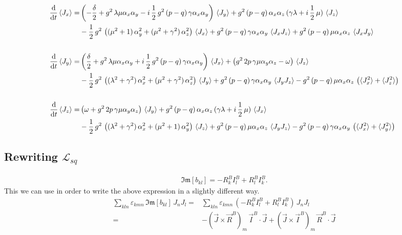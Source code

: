 \documentclass{article}
\begin{document}
\begin{align*}
    \frac{\text{d}}{\text{d}t} \braket{J_x}=&\left(  -\frac{\delta}{2}+  g^2\,\lambda\mu\alpha_x\alpha_y - i\,\frac{1}{2}\,g^2\,(p-q)\,\gamma\alpha_x\alpha_y \right)\,\braket{J_y}+g^2\,(p-q)\,\alpha_x\alpha_z\,(\gamma\lambda+ i\, \frac{1}{2}\,\mu)\,\braket{J_z}\\
    &-\frac{1}{2}\,g^2\,\left((\mu^2+1)\,\alpha_y^2+ (\mu^2+\gamma^2)\,\alpha_z^2\right)\,\braket{J_x}+g^2\,(p-q)\,\gamma\alpha_x\alpha_y \,\braket{J_xJ_z}+g^2\,(p-q)\,\mu\alpha_x\alpha_z\,\braket{J_xJ_y}\\\\
    \frac{\text{d}}{\text{d}t} \braket{J_y}=&\left( \frac{\delta}{2} + g^2\,\lambda\mu\alpha_x\alpha_y + i\,\frac{1}{2}\,g^2\,(p-q)\,\gamma\alpha_x\alpha_y \right)\,\braket{J_x}+\left(g^2\,2p\,\gamma\mu\alpha_y\alpha_z-\omega\right)\,\braket{J_z}\\
    &-\frac{1}{2}\,g^2\,\left((\lambda^2+\gamma^2)\,\alpha_x^2+(\mu^2+\gamma^2)\,\alpha_z^2\right)\,\braket{J_y}+g^2\,(p-q)\,\gamma\alpha_x\alpha_y \,\braket{J_y J_z}-g^2\,(p-q)\,\mu\alpha_x\alpha_z\,\left(\braket{J_x^2}+\braket{J_z^2}\right)\\\\
    \frac{\text{d}}{\text{d}t} \braket{J_z}=&\left( \omega + g^2\,2p\,\gamma\mu\alpha_y\alpha_z \right)\,\braket{J_y}+g^2\,(p-q)\,\alpha_x\alpha_z \,(\gamma\lambda+i\,\frac{1}{2}\,\mu)\,\braket{J_x}\\
    &-\frac{1}{2}\,g^2\,\left((\lambda^2+\gamma^2)\,\alpha_x^2+(\mu^2+1)\,\alpha_y^2\right)\,\braket{J_z}+g^2\,(p-q)\,\mu\alpha_x\alpha_z\,\braket{J_y J_z}-g^2\,(p-q)\,\gamma\alpha_x\alpha_y\,\left(\braket{J_x^2}+\braket{J_y^2}\right)
\end{align*}

\subsection*{Rewriting $\mathcal{L}_{sq}$}

\begin{align*}
    \mathfrak{Im}[b_{kl}]=-R^B_k I^B_l + R^B_l I^B_k .
\end{align*}
This we can use in order to write the above expression in a slightly different way.
\begin{align*}
    \sum_{kln}\varepsilon_{kmn}\,\mathfrak{Im}[b_{kl}]\,J_n J_l=&\sum_{kln}\varepsilon_{kmn}\,(-R^B_k I^B_l + R^B_l I^B_k) \,J_n J_l\\
    =&-(\vec{J}\times\vec{R}^B)_m\,\vec{I}^B\cdot\vec{J}+(\vec{J}\times\vec{I}^B)_m\,\vec{R}^B\cdot\vec{J}
\end{align*}
\end{document}
